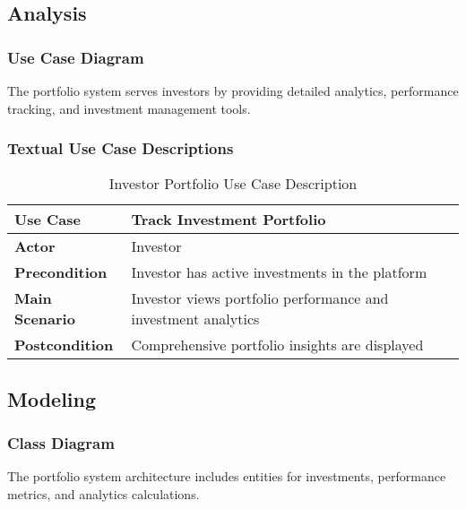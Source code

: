 \subsection{Analysis}
\subsubsection{Use Case Diagram}
The portfolio system serves investors by providing detailed analytics, performance tracking, and investment management tools.


\subsubsection{Textual Use Case Descriptions}

\begin{table}[htbp]
    \centering
    \begin{tabular}{|p{3cm}|p{10cm}|}
        \hline
        \textbf{Use Case} & \textbf{Track Investment Portfolio} \\
        \hline
        \textbf{Actor} & Investor \\
        \hline
        \textbf{Precondition} & Investor has active investments in the platform \\
        \hline
        \textbf{Main Scenario} & Investor views portfolio performance and investment analytics \\
        \hline
        \textbf{Postcondition} & Comprehensive portfolio insights are displayed \\
        \hline
    \end{tabular}
    \caption{Investor Portfolio Use Case Description}
    \label{tab:investor-portfolio-use-case}
\end{table}

\subsection{Modeling}
\subsubsection{Class Diagram}
The portfolio system architecture includes entities for investments, performance metrics, and analytics calculations.

